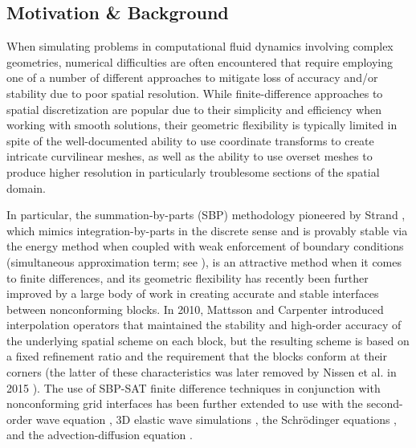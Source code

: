 \subsection{Motivation \& Background} \label{sec:hybrid_goals}


When simulating problems in computational fluid dynamics involving complex
geometries, numerical difficulties are often encountered that require
employing one of a number of different approaches to mitigate loss of accuracy and/or stability
due to poor spatial resolution. While finite-difference approaches to spatial
discretization are popular due to their simplicity and efficiency when working
with smooth solutions, their geometric flexibility is typically limited in spite
of the well-documented ability to use coordinate transforms to create intricate
curvilinear meshes, as well as the ability to use overset meshes \cite{bodony2011provably, noack2005summary}
to produce higher resolution in particularly troublesome sections of the spatial domain.

In particular, the summation-by-parts (SBP) methodology pioneered by Strand \cite{strand1994summation},
which mimics integration-by-parts in the discrete sense and is provably stable via the
energy method when coupled with weak enforcement of boundary conditions (simultaneous approximation term; see \cite{svard2007stable}),
is an attractive method when it comes to finite differences, and its geometric
flexibility has recently been further improved by a large body of work in creating
accurate and stable interfaces between nonconforming blocks. In 2010, Mattsson and
Carpenter \cite{mattsson2010stable} introduced interpolation operators that maintained
the stability and high-order accuracy of the underlying spatial scheme on each block,
but the resulting scheme is based on a fixed refinement ratio and the requirement that
the blocks conform at their corners (the latter of these characteristics was
later removed by Nissen et al. in 2015 \cite{nissen2015stable}). The use of SBP-SAT finite
difference techniques in conjunction with nonconforming grid interfaces has been further
extended to use with the second-order wave equation \cite{wang2016high}, 3D elastic wave
simulations \cite{gao2020energy}, the Schr{\"o}dinger equations \cite{nissen2012stability},
and the advection-diffusion equation \cite{lundquist2018hybrid}. 

